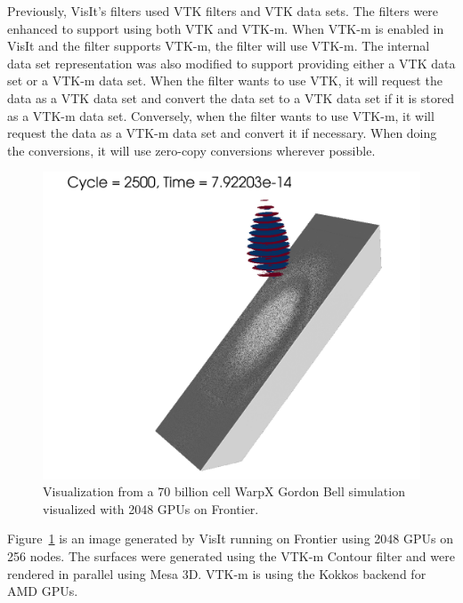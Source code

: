 Previously, VisIt's filters used VTK filters and VTK data sets. The filters were enhanced to support using both VTK and VTK-m. When VTK-m is enabled in VisIt and the filter supports VTK-m, the filter will use VTK-m. The internal data set representation was also modified to support providing either a VTK data set or a VTK-m data set. When the filter wants to use VTK, it will request the data as a VTK data set and convert the data set to a VTK data set if it is stored as a VTK-m data set. Conversely, when the filter wants to use VTK-m, it will request the data as a VTK-m data set and convert it if necessary. When doing the conversions, it will use zero-copy conversions wherever possible.

\begin{figure}[htb]
  \includegraphics[width=\linewidth]{figures/visit_warpx_frontier.png}
  \caption{Visualization from a 70 billion cell WarpX Gordon Bell simulation~\cite{FedeliHuebl2022} visualized with 2048 GPUs on Frontier.}
  \label{fig:visit_warpx_frontier}
\end{figure}

Figure~\ref{fig:visit_warpx_frontier} is an image generated by VisIt running on Frontier using 2048 GPUs on 256 nodes. The surfaces were generated using the VTK-m Contour filter and were rendered in parallel using Mesa 3D. VTK-m is using the Kokkos backend for AMD GPUs.

